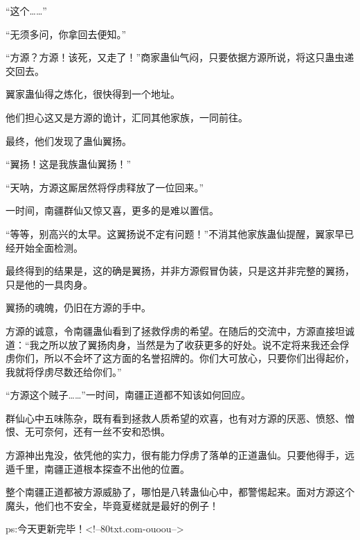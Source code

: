 \begin{this_body}
“这个……”

“无须多问，你拿回去便知。”

“方源？方源！该死，又走了！”商家蛊仙气闷，只要依据方源所说，将这只蛊虫递交回去。

翼家蛊仙得之炼化，很快得到一个地址。

他们担心这又是方源的诡计，汇同其他家族，一同前往。

最终，他们发现了蛊仙翼扬。

“翼扬！这是我族蛊仙翼扬！”

“天呐，方源这厮居然将俘虏释放了一位回来。”

一时间，南疆群仙又惊又喜，更多的是难以置信。

“等等，别高兴的太早。这翼扬说不定有问题！”不消其他家族蛊仙提醒，翼家早已经开始全面检测。

最终得到的结果是，这的确是翼扬，并非方源假冒伪装，只是这并非完整的翼扬，只是他的一具肉身。

翼扬的魂魄，仍旧在方源的手中。

方源的诚意，令南疆蛊仙看到了拯救俘虏的希望。在随后的交流中，方源直接坦诚道：“我之所以放了翼扬肉身，当然是为了收获更多的好处。说不定将来我还会俘虏你们，所以不会坏了这方面的名誉招牌的。你们大可放心，只要你们出得起价，我就将俘虏尽数还给你们。”

“方源这个贼子……”一时间，南疆正道都不知该如何回应。

群仙心中五味陈杂，既有看到拯救人质希望的欢喜，也有对方源的厌恶、愤怒、憎恨、无可奈何，还有一丝不安和恐惧。

方源神出鬼没，依凭他的实力，很有能力俘虏了落单的正道蛊仙。只要他得手，远遁千里，南疆正道根本探查不出他的位置。

整个南疆正道都被方源威胁了，哪怕是八转蛊仙心中，都警惕起来。面对方源这个魔头，他们也不安全，毕竟夏槎就是最好的例子！

ps:今天更新完毕！<!--80txt.com-ouoou-->

\end{this_body}

